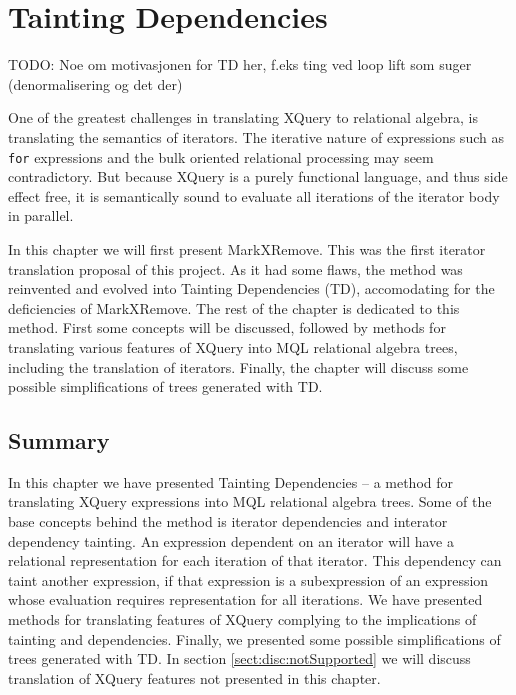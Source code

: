 \chapter{Tainting Dependencies}
\label{sect:translation}
\label{chapter:translation}

TODO: Noe om motivasjonen for TD her, f.eks ting ved loop lift som suger
(denormalisering og det der)

One of the greatest challenges in translating XQuery to relational algebra, is translating the semantics of
iterators. The iterative nature of expressions such as \texttt{for} expressions and the bulk oriented relational
processing may seem contradictory. But because XQuery is a purely functional language, and thus side effect free,
it is semantically sound to evaluate all iterations of the iterator body in
parallel.

In this chapter we will first present MarkXRemove. This was the first iterator translation proposal of this
project. As it had some flaws, the method was reinvented and evolved into Tainting Dependencies (TD), accomodating
for the deficiencies of MarkXRemove. The rest of the chapter is dedicated to this method. First some concepts will
be discussed, followed by methods for translating various features of XQuery into MQL relational algebra trees,
including the translation of iterators. Finally, the chapter will discuss some possible simplifications of trees
generated with TD.













\section{Summary}
\label{sect:trans:summary}

In this chapter we have presented Tainting Dependencies -- a method for
translating XQuery expressions into MQL relational algebra trees. Some of the
base concepts behind the method is iterator dependencies and interator dependency tainting. An expression dependent
on an iterator will have a relational representation for each iteration of that iterator. This
dependency can taint another expression, if that expression is a subexpression
of an expression whose evaluation requires representation for all iterations.
We have presented methods for translating features of XQuery complying to the
implications of tainting and dependencies. Finally, we presented some possible
simplifications of trees generated with TD. In section
\ref{sect:disc:notSupported} we will discuss translation of XQuery features
not presented in this chapter.
